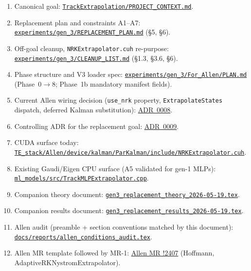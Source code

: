 \documentclass[11pt,a4paper]{article}
\newcommand{\code}[1]{\texttt{#1}}
\begin{document}
\begin{enumerate}[leftmargin=2em,itemsep=2pt]
\item Canonical goal:
  \href{run:../../PROJECT_CONTEXT.md}{\code{TrackExtrapolation/PROJECT\_CONTEXT.md}}.
\item Replacement plan and constraints A1--A7:
  \href{run:../../experiments/gen_3/REPLACEMENT_PLAN.md}{\code{experiments/gen\_3/REPLACEMENT\_PLAN.md}}
  (\S5, \S6).
\item Off-goal cleanup, \code{NRKExtrapolator.cuh} re-purpose:
  \href{run:../../experiments/gen_3/CLEANUP_LIST.md}{\code{experiments/gen\_3/CLEANUP\_LIST.md}}
  (\S1.3, \S3.6, \S6).
\item Phase structure and V3 loader spec:
  \href{run:../../experiments/gen_3/For_Allen/PLAN.md}{\code{experiments/gen\_3/For\_Allen/PLAN.md}}
  (Phase~0$\to$8; Phase~1b mandatory manifest fields).
\item Current Allen wiring decision (\code{use\_nrk} property,
  \code{ExtrapolateStates} dispatch, deferred Kalman substitution):
  \href{run:../../experiments/gen_3/For_Allen/docs/decisions/0008-allen-wiring-plan.md}{ADR~0008}.
\item Controlling ADR for the replacement goal:
  \href{run:../../experiments/gen_3/For_Allen/docs/decisions/0009-replacement-goal-restated.md}{ADR~0009}.
\item CUDA surface today:
  \href{run:../../../TE_stack/Allen/device/kalman/ParKalman/include/NRKExtrapolator.cuh}{\code{TE\_stack/Allen/device/kalman/ParKalman/include/NRKExtrapolator.cuh}}.
\item Existing Gaudi/Eigen CPU surface (A5 validated for gen-1 MLPs):
  \href{run:../../ml_models/src/TrackMLPExtrapolator.cpp}{\code{ml\_models/src/TrackMLPExtrapolator.cpp}}.
\item Companion theory document:
  \href{run:gen3_replacement_theory_2026-05-19.tex}{\code{gen3\_replacement\_theory\_2026-05-19.tex}}.
\item Companion results document:
  \href{run:gen3_replacement_results_2026-05-19.tex}{\code{gen3\_replacement\_results\_2026-05-19.tex}}.
\item Allen audit (preamble + section conventions matched by this document):
  \href{run:allen_conditions_audit.tex}{\code{docs/reports/allen\_conditions\_audit.tex}}.
\item Allen MR template followed by MR-1:
  \href{https://gitlab.cern.ch/lhcb/Allen/-/merge_requests/2407}{Allen MR !2407}
  (Hoffmann, AdaptiveRKNystromExtrapolator).
\end{enumerate}
\end{document}
